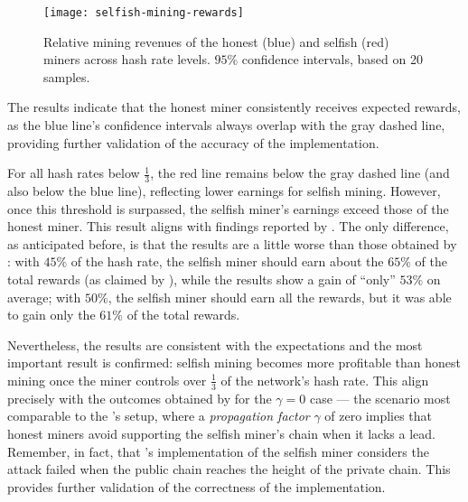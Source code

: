 \begin{figure}[tbhp]
	\centering
	\texttt{[image: selfish-mining-rewards]}
	\caption{Relative mining revenues of the honest (blue) and selfish
	(red) miners across hash rate levels. \(95\%\) confidence intervals,
	based on 20 samples.}\label{fig:selfish-reward}
\end{figure}

The results indicate that the honest miner consistently receives expected
rewards, as the blue line's confidence intervals always overlap with the gray
dashed line, providing further validation of the accuracy of the \iblock{}
implementation.

For all hash rates below \(\frac{1}{3}\), the red line remains below the gray
dashed line (and also below the blue line), reflecting lower earnings for
selfish mining. However, once this threshold is surpassed, the selfish miner's
earnings exceed those of the honest miner. This result aligns with findings
reported by \citeauthor{selfish-mining}. The only difference, as anticipated
before, is that the results are a little worse than those obtained by
\citeauthor{selfish-mining}: with \(45\%\) of the hash rate, the selfish miner
should earn about the \(65\%\) of the total rewards (as claimed by
\citeauthor{selfish-mining}), while the results show a gain of ``only''
\(53\%\) on average; with \(50\%\), the selfish miner should earn all the
rewards, but it was able to gain only the \(61\%\) of the total rewards.

Nevertheless, the results are consistent with the expectations and the most
important result is confirmed: selfish mining becomes more profitable than
honest mining once the miner controls over \(\frac{1}{3}\) of the network's
hash rate. This align precisely with the outcomes obtained by
\citeauthor{selfish-mining} for the \(\gamma = 0\) case --- the scenario most
comparable to the \iblock{}'s setup, where a \emph{propagation factor}
\(\gamma\) of zero implies that honest miners avoid supporting the selfish
miner's chain when it lacks a lead. Remember, in fact, that \iblock{}'s
implementation of the selfish miner considers the attack failed when the public
chain reaches the height of the private chain. This provides further validation
of the correctness of the \iblock{} implementation.
